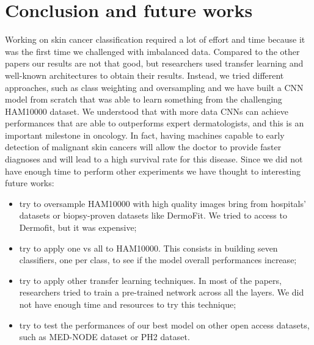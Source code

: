 \section{Conclusion and future works} \label{conclusion}
	
	Working on skin cancer classification required a lot of effort and time because it was the first time we challenged with imbalanced data. 
	Compared to the other papers our results are not that good, but researchers used transfer learning and well-known architectures to obtain their results. Instead, we tried different approaches, such as class weighting and oversampling and we have built a CNN model from scratch that was able to learn something from the challenging HAM10000 dataset. 
	We understood that with more data CNNs can achieve performances that are able to outperforms expert dermatologists, and this is an important milestone in oncology. In fact, having machines capable to early detection of malignant skin cancers will allow the doctor to provide faster diagnoses and will lead to a high survival rate for this disease. Since we did not have enough time to perform other experiments we have thought to interesting future works:

	\begin{itemize}
		\item try to oversample HAM10000 with high quality images bring from hospitals' datasets or biopsy-proven datasets like DermoFit\cite{dermofit}. We tried to access to Dermofit, but it was expensive;
		\item try to apply one vs all to HAM10000. This consists in building seven classifiers, one per class, to see if the model overall performances increase;
		\item try to apply other transfer learning techniques. In most of the papers, researchers tried to train a pre-trained network across all the layers. We did not have enough time and resources to try this technique;
		\item try to test the performances of our best model on other open access datasets, such as MED-NODE dataset\cite{mednode} or PH2 dataset\cite{ph2}. 	
	\end{itemize}